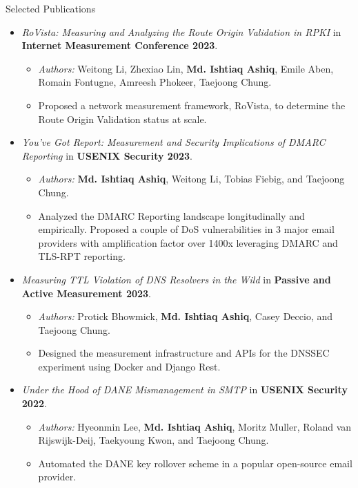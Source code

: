 \documentclass[]{mcdowellcv}
\begin{document}
	\begin{cvsection}{Selected Publications}
		\begin{cvsubsection}{}{}{}
			\begin{itemize}
				\item \textit{RoVista: Measuring and Analyzing the Route Origin Validation in RPKI} in \textbf{Internet Measurement Conference 2023}.
				\begin{itemize}
					\item \textit{Authors:} Weitong Li, Zhexiao Lin, \textbf{Md. Ishtiaq Ashiq}, Emile Aben, Romain Fontugne, Amreesh Phokeer, Taejoong Chung.
					\item Proposed a network measurement framework, RoVista, to determine the Route Origin Validation status at scale.
				\end{itemize}
				\item \textit{You’ve Got Report: Measurement and Security Implications of DMARC Reporting} in \textbf{USENIX Security 2023}.
				\begin{itemize}
					\item \textit{Authors:} \textbf{Md. Ishtiaq Ashiq}, Weitong Li, Tobias Fiebig, and Taejoong Chung.
					\item Analyzed the DMARC Reporting landscape longitudinally and empirically. Proposed a couple of DoS vulnerabilities
					in 3 major email providers with amplification factor over 1400x leveraging DMARC and TLS-RPT reporting.
				\end{itemize}
				\item \textit{Measuring TTL Violation of DNS Resolvers in the Wild} in \textbf{Passive and Active Measurement 2023}.
				\begin{itemize}
					\item \textit{Authors:} Protick Bhowmick, \textbf{Md. Ishtiaq Ashiq}, Casey Deccio, and Taejoong Chung.
					\item Designed the measurement infrastructure and APIs for the DNSSEC experiment using Docker and Django Rest.
				\end{itemize}
				\item \textit{Under the Hood of DANE Mismanagement in SMTP} in \textbf{USENIX Security 2022}.
				\begin{itemize}
					\item \textit{Authors:} Hyeonmin Lee, \textbf{Md. Ishtiaq Ashiq}, Moritz Muller, Roland van Rijswijk-Deij, Taekyoung Kwon, and Taejoong Chung.
					\item Automated the DANE key rollover scheme in a popular open-source email provider.

\end{itemize}
\end{itemize}
\end{cvsubsection}
\end{cvsection}
\end{document}

